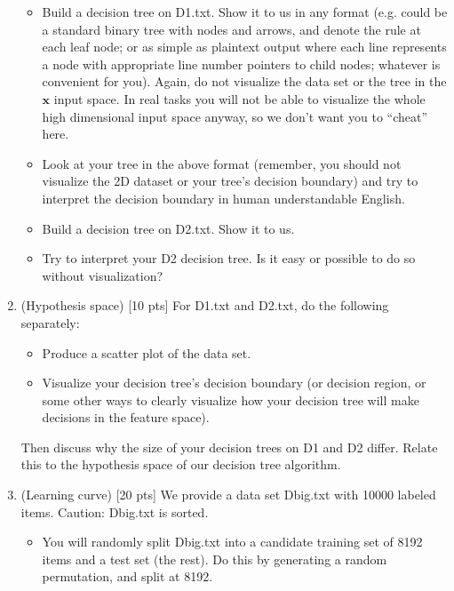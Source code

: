 \documentclass[letter]{article}
\theoremstyle{definition}
\def\x{\mathbf x}
\begin{document}
\begin{enumerate}
\begin{itemize}
  \item Build a decision tree on D1.txt.  Show it to us in any format (e.g. could be a standard binary tree with nodes and arrows, and denote the rule at each leaf node; or as simple as plaintext output where each line represents a node with appropriate line number pointers to child nodes; whatever is convenient for you). Again, do not visualize the data set or the tree in the $\x$ input space.  In real tasks you will not be able to visualize the whole high dimensional input space anyway, so we don't want you to ``cheat'' here. 
  
  \item Look at your tree in the above format (remember, you should not visualize the 2D dataset or your tree's decision boundary) and try to interpret the decision boundary in human understandable English. 
  
  \item Build a decision tree on D2.txt.  Show it to us. 
  
  \item Try to interpret your D2 decision tree. Is it easy or possible to do so without visualization? \\
  
  \end{itemize}

\item (Hypothesis space)  [10 pts] For D1.txt and D2.txt, do the following separately:
  \begin{itemize}
  
  \item Produce a scatter plot of the data set.

  \item Visualize your decision tree's decision boundary (or decision region, or some other ways to clearly visualize how your decision tree will make decisions in the feature space).

  \end{itemize}
Then discuss why the size of your decision trees on D1 and D2 differ.  Relate this to the hypothesis space of our decision tree algorithm. \\

\item (Learning curve)  [20 pts] We provide a data set Dbig.txt with 10000 labeled items.  Caution: Dbig.txt is sorted.
  \begin{itemize}
  
  \item You will randomly split Dbig.txt into a candidate training set of 8192 items and a test set (the rest).  Do this by generating a random permutation, and split at 8192.
  

\end{itemize}
\end{enumerate}
\end{document}
